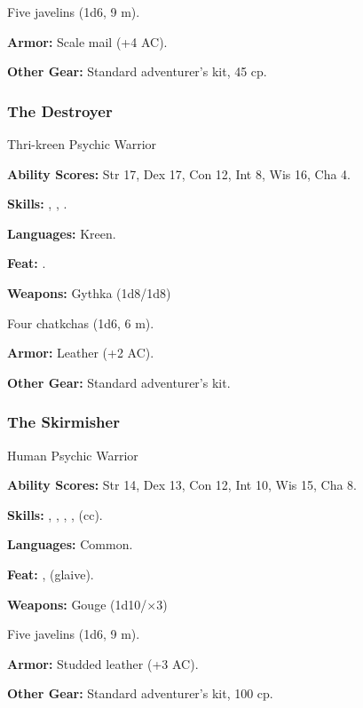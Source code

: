 Five javelins (1d6, 9 m).

\textbf{Armor:} Scale mail (+4 AC).

\textbf{Other Gear:} Standard adventurer's kit, 45 cp.

\subsubsection{The Destroyer}

Thri-kreen Psychic Warrior

\textbf{Ability Scores:} Str 17, Dex 17, Con 12, Int 8, Wis 16, Cha 4.

\textbf{Skills:} , , .

\textbf{Languages:} Kreen.

\textbf{Feat:} .

\textbf{Weapons:} Gythka (1d8/1d8)

Four chatkchas (1d6, 6 m).

\textbf{Armor:} Leather (+2 AC).

\textbf{Other Gear:} Standard adventurer's kit.

\subsubsection{The Skirmisher}

Human Psychic Warrior

\textbf{Ability Scores:} Str 14, Dex 13, Con 12, Int 10, Wis 15, Cha 8.

\textbf{Skills:} , , , ,  (cc).

\textbf{Languages:} Common.

\textbf{Feat:} ,  (glaive).

\textbf{Weapons:} Gouge (1d10/$\times$3)

Five javelins (1d6, 9 m).

\textbf{Armor:} Studded leather (+3 AC).

\textbf{Other Gear:} Standard adventurer's kit, 100 cp.

